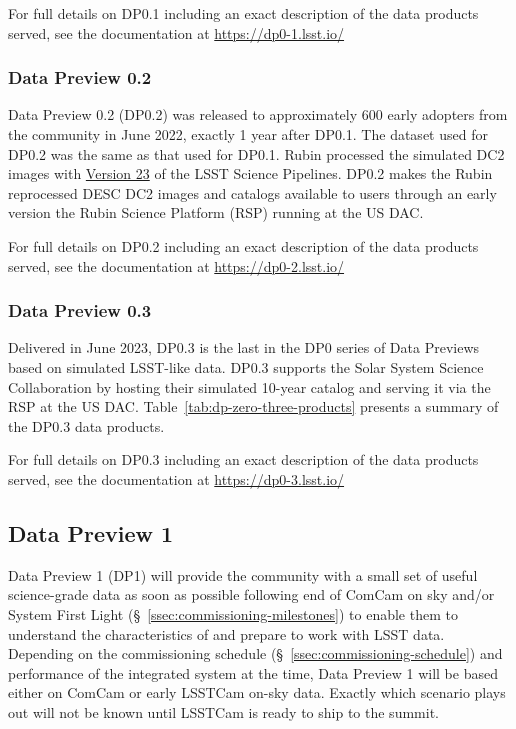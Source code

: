 For full details on DP0.1 including an exact description of the data products served, see the documentation at \url{https://dp0-1.lsst.io/}

\subsubsection{Data Preview 0.2}
\label{sec:dp02}

Data Preview 0.2 (DP0.2) was released to approximately 600 early adopters from the community in June 2022, exactly 1 year after DP0.1. 
The dataset used for DP0.2 was the same as that used for DP0.1.
Rubin processed the simulated DC2 images with \href{https://pipelines.lsst.io/v/v23_0_0/index.html}{Version 23} of the LSST Science Pipelines. 
DP0.2 makes the Rubin reprocessed DESC DC2 images and catalogs available to users through an early version the Rubin Science Platform (RSP) running at the US DAC. 

For full details on DP0.2 including an exact description of the data products served, see the documentation at \url{https://dp0-2.lsst.io/}

\subsubsection{Data Preview 0.3}
\label{sec:dp03}

Delivered in June  2023, DP0.3 is the last in the DP0 series of Data Previews based on simulated LSST-like data. 
DP0.3 supports the Solar System Science Collaboration by hosting their simulated 10-year catalog and serving it via the RSP at the US DAC. 
Table~\ref{tab:dp-zero-three-products} presents a summary of the  DP0.3 data products.

For full details on DP0.3 including an exact description of the data products served, see the documentation at \url{https://dp0-3.lsst.io/}

\subsection{Data Preview 1}
\label{sec:dp1}

Data Preview 1 (DP1) will provide the community with a small set of useful science-grade data as soon as possible following end of ComCam on sky and/or System First Light (\S~\ref{ssec:commissioning-milestones}) to enable them to understand the characteristics of and prepare to work with LSST data. 
Depending on the commissioning schedule (\S~\ref{ssec:commissioning-schedule}) and  performance of the integrated system at the time, Data Preview 1 will be based either on ComCam  or early LSSTCam on-sky data. 
Exactly which scenario plays out will not be known until LSSTCam is ready to ship to the summit. 

